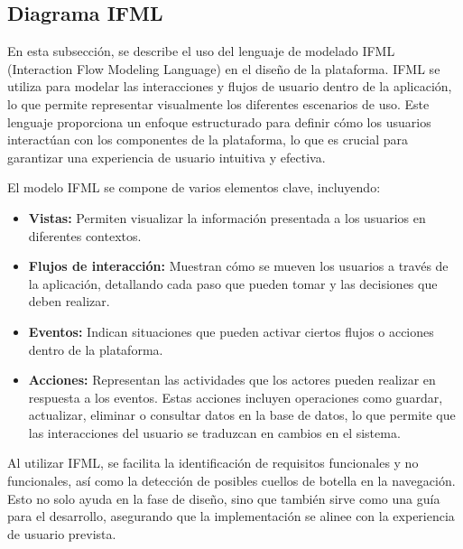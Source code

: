\documentclass{article}
\begin{document}
\newpage
\subsection{Diagrama IFML}


En esta subsección, se describe el uso del lenguaje de modelado IFML (Interaction Flow Modeling Language) en el diseño de la plataforma. IFML se utiliza para modelar las interacciones y flujos de usuario dentro de la aplicación, lo que permite representar visualmente los diferentes escenarios de uso. Este lenguaje proporciona un enfoque estructurado para definir cómo los usuarios interactúan con los componentes de la plataforma, lo que es crucial para garantizar una experiencia de usuario intuitiva y efectiva.

El modelo IFML se compone de varios elementos clave, incluyendo:

\begin{itemize}
	\item \textbf{Vistas:} Permiten visualizar la información presentada a los usuarios en diferentes contextos.
	\item \textbf{Flujos de interacción:} Muestran cómo se mueven los usuarios a través de la aplicación, detallando cada paso que pueden tomar y las decisiones que deben realizar.
	\item \textbf{Eventos:} Indican situaciones que pueden activar ciertos flujos o acciones dentro de la plataforma.
	\item \textbf{Acciones:} Representan las actividades que los actores pueden realizar en respuesta a los eventos. Estas acciones incluyen operaciones como guardar, actualizar, eliminar o consultar datos en la base de datos, lo que permite que las interacciones del usuario se traduzcan en cambios en el sistema.
\end{itemize}

Al utilizar IFML, se facilita la identificación de requisitos funcionales y no funcionales, así como la detección de posibles cuellos de botella en la navegación. Esto no solo ayuda en la fase de diseño, sino que también sirve como una guía para el desarrollo, asegurando que la implementación se alinee con la experiencia de usuario prevista. 
\end{document}
